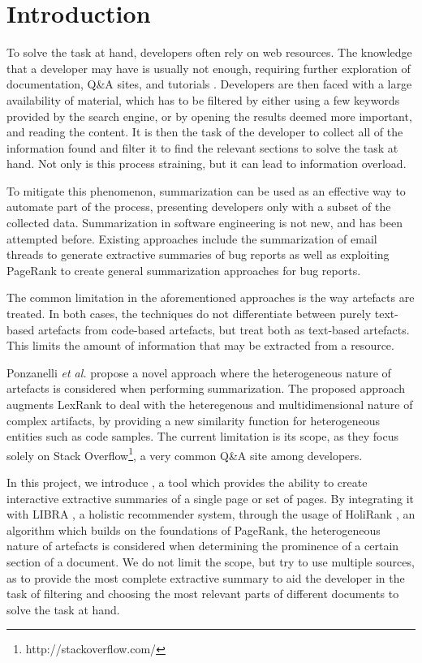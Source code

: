 \section{Introduction}\label{sec:introduction}
To solve the task at hand, developers often rely on web resources. The knowledge that a developer may have is usually not enough, requiring further exploration of documentation, Q\&A sites, and tutorials \cite{A1}. Developers are then faced with a large availability of material, which has to be filtered by either using a few keywords provided by the search engine, or by opening the results deemed more important, and reading the content. It is then the task of the developer to collect all of the information found and filter it to find the relevant sections to solve the task at hand. Not only is this process straining, but it can lead to information overload.

To mitigate this phenomenon, summarization can be used as an effective way to automate part of the process, presenting developers only with a subset of the collected data. Summarization in software engineering is not new, and has been attempted before. Existing approaches include the summarization of email threads \cite{A4} to generate extractive summaries of bug reports as well as exploiting PageRank \cite{ilprints422} to create general summarization approaches for bug reports. 

The common limitation in the aforementioned approaches is the way artefacts are treated. In both cases, the techniques do not differentiate between purely text-based artefacts from code-based artefacts, but treat both as text-based artefacts. This limits the amount of information that may be extracted from a resource. 

Ponzanelli \textit{et al.} \cite{Ponz2015b} propose a novel approach where the heterogeneous nature of artefacts is considered when performing summarization. The proposed approach augments LexRank \cite{Erkan:2004:LGL:1622487.1622501} to deal with the heteregenous and multidimensional nature of complex artifacts, by providing a new similarity function for heterogeneous entities such as code samples. The current limitation is its scope, as they focus solely on Stack Overflow\footnote{http://stackoverflow.com/}, a very common Q\&A site among developers.

 In this project, we introduce \projectName, a tool which provides the ability to create interactive extractive summaries of a single page or set of pages. By integrating it with LIBRA \cite{Ponz2017a}, a holistic recommender system,  through the usage of HoliRank \cite{Ponz2017a}, an algorithm which builds on the foundations of PageRank\cite{ilprints422}, the heterogeneous nature of artefacts is considered when determining the prominence of a certain section of a document. We do not limit the scope, but try to use multiple sources, as to provide the most complete extractive summary to aid the developer in the task of filtering and choosing the most relevant parts of different documents to solve the task at hand.

